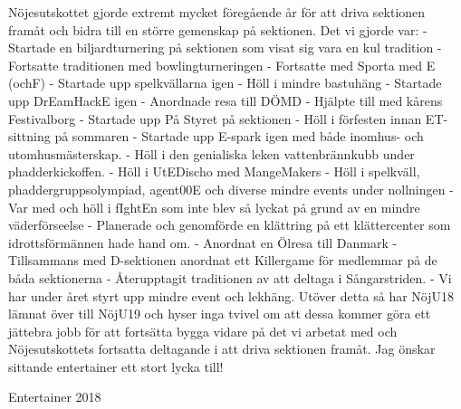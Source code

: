 \documentclass[../_main/handlingar.tex]{subfiles}
\begin{document}

Nöjesutskottet gjorde extremt mycket föregående år för att driva sektionen framåt och bidra
till en större gemenskap på sektionen. Det vi gjorde var:
- Startade en biljardturnering på sektionen som visat sig vara en kul tradition
- Fortsatte traditionen med bowlingturneringen
- Fortsatte med Sporta med E (ochF)
- Startade upp spelkvällarna igen
- Höll i mindre bastuhäng
- Startade upp DrEamHackE igen
- Anordnade resa till DÖMD
- Hjälpte till med kårens Festivalborg
- Startade upp På Styret på sektionen
- Höll i förfesten innan ET-sittning på sommaren
- Startade upp E-spark igen med både inomhus- och utomhusmästerskap.
- Höll i den genialiska leken vattenbrännkubb under phadderkickoffen.
- Höll i UtEDischo med MangeMakers
- Höll i spelkväll, phaddergruppsolympiad, agent00E och diverse mindre events under
nollningen
- Var med och höll i fIghtEn som inte blev så lyckat på grund av en mindre
väderförseelse
- Planerade och genomförde en klättring på ett klättercenter som idrottsförmännen hade
hand om.
- Anordnat en Ölresa till Danmark
- Tillsammans med D-sektionen anordnat ett Killergame för medlemmar på de båda
sektionerna
- Återupptagit traditionen av att deltaga i Sångarstriden.
- Vi har under året styrt upp mindre event och lekhäng.
Utöver detta så har NöjU18 lämnat över till NöjU19 och hyser inga tvivel om att dessa
kommer göra ett jättebra jobb för att fortsätta bygga vidare på det vi arbetat med och
Nöjesutskottets fortsatta deltagande i att driva sektionen framåt. Jag önskar sittande
entertainer ett stort lycka till!

\begin{signatures}{1}
    \mvh
    \signature{Adam Belfrage}{Entertainer 2018}
\end{signatures}
\end{document}
